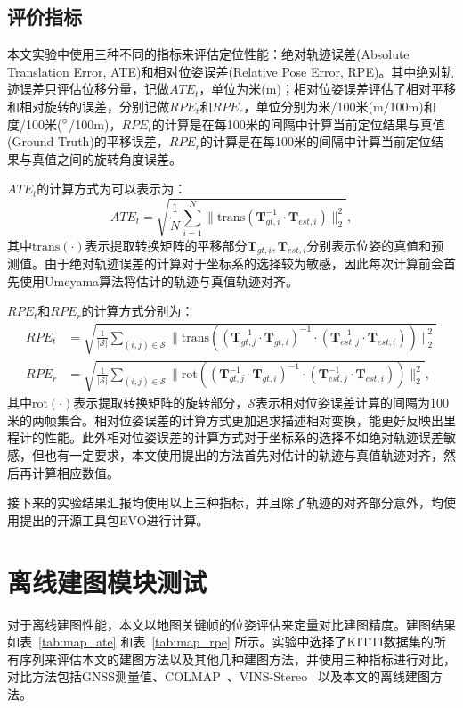 \subsection{评价指标}

本文实验中使用三种不同的指标来评估定位性能：绝对轨迹误差(Absolute Translation Error, ATE)\cite{sturm2012benchmark}和相对位姿误差(Relative Pose Error, RPE)\cite{geiger2012we}。其中绝对轨迹误差只评估位移分量，记做$ATE_t$，单位为米(m)；相对位姿误差评估了相对平移和相对旋转的误差，分别记做$RPE_{t}$和$RPE_{r}$，单位分别为米/100米(m/100m)和度/100米($\degree$/100m)，$RPE_{t}$的计算是在每100米的间隔中计算当前定位结果与真值(Ground Truth)的平移误差，$RPE_{r}$的计算是在每100米的间隔中计算当前定位结果与真值之间的旋转角度误差。

$ATE_t$的计算方式为可以表示为：
\begin{equation}
  ATE_t = \sqrt{\frac{1}{N}\sum_{i=1}^{N}\|\text{trans}(\symbf{T}_{gt,i}^{-1}\cdot \symbf{T}_{est,i})\|^{2}_{2}},
\end{equation}
其中$\text{trans}(\cdot)$表示提取转换矩阵的平移部分$\symbf{T}_{gt,i}, \symbf{T}_{est,i}$分别表示位姿的真值和预测值。由于绝对轨迹误差的计算对于坐标系的选择较为敏感，因此每次计算前会首先使用Umeyama算法\cite{arun1987least}将估计的轨迹与真值轨迹对齐。

$RPE_{t}$和$RPE_{r}$的计算方式分别为：
\begin{align}
  RPE_{t} &= \sqrt{\frac{1}{|\mathcal{S}|}\sum_{(i,j) \in \mathcal{S}}\| \text{trans}\left ((\symbf{T}_{gt,j}^{-1} \cdot \symbf{T}_{gt,i})^{-1}\cdot (\symbf{T}_{est,j}^{-1} \cdot \symbf{T}_{est,i}) \right ) \|_2^2} \\
  RPE_{r} &= \sqrt{\frac{1}{|\mathcal{S}|}\sum_{(i,j) \in \mathcal{S}}\| \text{rot}\left ((\symbf{T}_{gt,j}^{-1} \cdot \symbf{T}_{gt,i})^{-1}\cdot (\symbf{T}_{est,j}^{-1} \cdot \symbf{T}_{est,i}) \right ) \|_2^2},
\end{align}
其中$\text{rot}(\cdot)$表示提取转换矩阵的旋转部分，$\mathcal{S}$表示相对位姿误差计算的间隔为100米的两帧集合。相对位姿误差的计算方式更加追求描述相对变换，能更好反映出里程计的性能。此外相对位姿误差的计算方式对于坐标系的选择不如绝对轨迹误差敏感，但也有一定要求，本文使用\citet{li2023textslam}提出的方法首先对估计的轨迹与真值轨迹对齐，然后再计算相应数值。

接下来的实验结果汇报均使用以上三种指标，并且除了轨迹的对齐部分意外，均使用\citet{grupp2017evo}提出的开源工具包EVO进行计算。

\section{离线建图模块测试}
对于离线建图性能，本文以地图关键帧的位姿评估来定量对比建图精度。建图结果如表~\ref{tab:map_ate} 和表~\ref{tab:map_rpe} 所示。实验中选择了KITTI数据集的所有序列来评估本文的建图方法以及其他几种建图方法，并使用三种指标进行对比，对比方法包括GNSS测量值、COLMAP~\cite{schonberger2016structure}、VINS-Stereo~\cite{qin2019a} 以及本文的离线建图方法。

